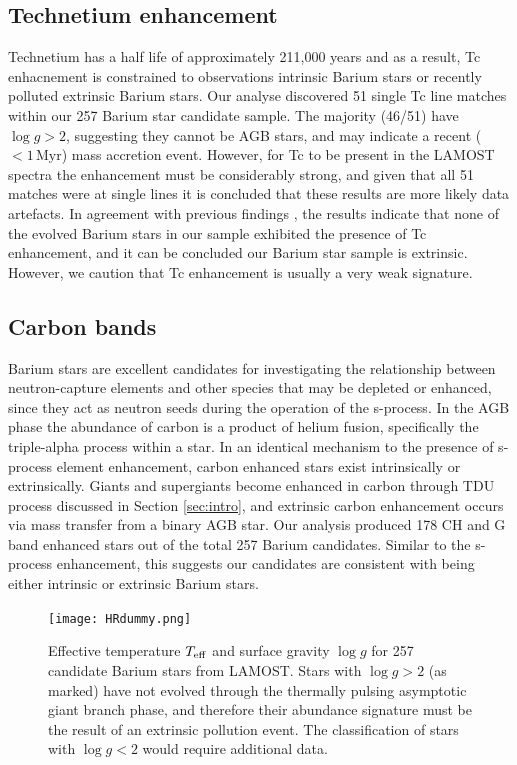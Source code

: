 \documentclass[a4paper,fleqn,usenatbib]{mnras}
\begin{document}
\subsection{Technetium enhancement}

Technetium has a half life of approximately 211,000 years and as a result, Tc enhacnement is constrained to observations intrinsic Barium stars \citep{jorissen1993} or recently polluted extrinsic Barium stars. Our analyse discovered 51 single Tc line matches within our 257 Barium star candidate sample. The majority (46/51) have $\log{g} > 2$, suggesting they cannot be AGB stars, and may indicate a recent ($<1\,\textrm{Myr}$) mass accretion event. However, for Tc to be present in the LAMOST spectra the enhancement must be considerably strong, and given that all 51 matches were at single lines it is concluded that these results are more likely data artefacts. In agreement with previous findings \citep[e.g.,][]{little1987,smith1984,smith1983}, the results indicate that none of the evolved Barium stars in our sample exhibited the presence of Tc enhancement, and it can be concluded our Barium star sample is extrinsic. However, we caution that Tc enhancement is usually a very weak signature.

\subsection{Carbon bands}
Barium stars are excellent candidates for investigating the relationship between neutron-capture elements and other species that may be depleted or enhanced, since they act as neutron seeds during the operation of the s-process. In the AGB phase the abundance of carbon is a product of helium fusion, specifically the triple-alpha process within a star. In an identical mechanism to the presence of s-process element enhancement, carbon enhanced stars exist intrinsically or extrinsically. Giants and supergiants become enhanced in carbon through TDU process discussed in Section \ref{sec:intro}, and extrinsic carbon enhancement occurs via mass transfer from a binary AGB star. Our analysis produced 178 CH and G band enhanced stars out of the total 257 Barium candidates. Similar to the s-process enhancement, this suggests our candidates are consistent with being either intrinsic or extrinsic Barium stars.

\begin{figure}
	\texttt{[image: HRdummy.png]}
    \caption{Effective temperature $T_{\rm eff}$ and surface gravity $\log{g}$ for 257 candidate Barium stars from LAMOST. Stars with $\log{g} > 2$ (as marked) have not evolved through the thermally pulsing asymptotic giant branch phase, and therefore their abundance signature must be the result of an extrinsic pollution event. The classification of stars with $\log{g} < 2$ would require additional data.}
    \label{fig:figure2}
\end{figure}
\end{document}
